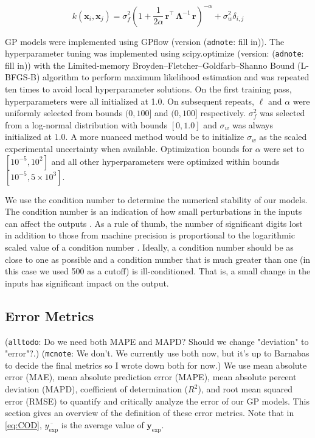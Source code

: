 \documentclass[journal=jacsat,manuscript=article]{achemso}
\newcommand{\alltodo}[1]{{\color{Cyan} (\texttt{alltodo}: #1)}}
\newcommand{\xvec}{\ensuremath{\mathbf{x}}}
\newcommand{\adnote}[1]{{\color{OliveGreen} (\texttt{adnote}: #1)}}
\newcommand{\mcnote}[1]{{\color{Plum} (\texttt{mcnote}: #1)}}
\begin{document}
\begin{equation}
    k(\xvec_i,\xvec_j) = \sigma_f^2 \left(1 +\frac{1}{2 \alpha} \,\mathbf{r}^\intercal \,\boldsymbol{\Lambda}^{-1} \,\mathbf{r} \right)^{-\alpha} + \sigma_w^2\delta_{i,j} 
    \label{kernel_final}
\end{equation} 

GP models were implemented using GPflow \cite{Matthews2017GPflow:TensorFlow} (version \adnote{fill in}). The hyperparameter tuning was implemented using scipy.optimize \cite{Virtanen2020SciPyPython} (version: \adnote{fill in}) with the Limited-memory Broyden–Fletcher–Goldfarb–Shanno Bound (L-BFGS-B) algorithm to perform maximum likelihood estimation and was repeated ten times to avoid local hyperparameter solutions. On the first training pass, hyperparameters were all initialized at 1.0. On subsequent repeats, $\ell$ and $\alpha$ were uniformly selected from bounds $(0, 100]$ and $(0, 100]$ respectively. $\sigma^2_f$ was selected from a log-normal distribution with bounds $[0,1.0]$ and $\sigma_w$ was always initialized at $1.0$. A more nuanced method would be to initialize $\sigma_w$ as the scaled experimental uncertainty when available. Optimization bounds for $\alpha$ were set to $[10^{-5}, 10^2]$ and all other hyperparameters were optimized within bounds $[10^{-5}, 5\times 10^3]$.

We use the condition number to determine the numerical stability of our models. The condition number is an indication of how small perturbations in the inputs can affect the outputs \cite{Foster2009}. As a rule of thumb, the number of significant digits lost in addition to those from machine precision is proportional to the logarithmic scaled value of a condition number \cite{NumMathComput}. Ideally, a condition number should be as close to one as possible and a condition number that is much greater than one (in this case we used 500 as a cutoff) is ill-conditioned. That is, a small change in the inputs has significant impact on the output.

\subsection{Error Metrics}
\alltodo{Do we need both MAPE and MAPD? Should we change "deviation" to "error"?.}
\mcnote{We don't. We currently use both now, but it's up to Barnabas to decide the final metrics so I wrote down both for now.}
We use mean absolute error (MAE), mean absolute prediction error (MAPE), mean absolute percent deviation (MAPD), coefficient of determination ($R^2$), and root mean squared error (RMSE) to quantify and critically analyze the error of our GP models. This section gives an overview of the definition of these error metrics. Note that in \eqref{eq:COD}, $\overline{y_{\text{exp}}}$ is the average value of $\mathbf{y}_{\text{exp}}$. 
\end{document}
